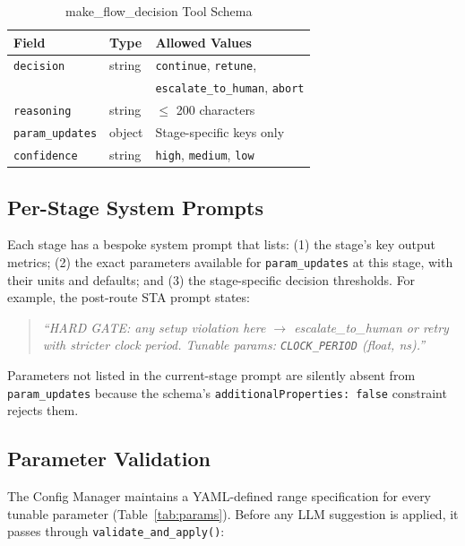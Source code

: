 \documentclass[conference]{IEEEtran}
\begin{document}
\begin{table}[t]
\caption{make\_flow\_decision Tool Schema}
\label{tab:schema}
\centering
\small
\setlength{\tabcolsep}{4pt}
\begin{tabular}{lll}
\toprule
\textbf{Field} & \textbf{Type} & \textbf{Allowed Values} \\
\midrule
\texttt{decision}      & string & \texttt{continue}, \texttt{retune}, \\
                       &        & \texttt{escalate\_to\_human}, \texttt{abort} \\
\texttt{reasoning}     & string & $\leq$ 200 characters \\
\texttt{param\_updates} & object & Stage-specific keys only \\
\texttt{confidence}    & string & \texttt{high}, \texttt{medium}, \texttt{low} \\
\bottomrule
\end{tabular}
\end{table}

\subsection{Per-Stage System Prompts}

Each stage has a bespoke system prompt that lists: (1) the stage's
key output metrics; (2) the exact parameters available for
\texttt{param\_updates} at this stage, with their units and defaults;
and (3) the stage-specific decision thresholds.
For example, the post-route STA prompt states:

\begin{quote}
\small\itshape
``HARD GATE: any setup violation here $\rightarrow$ escalate\_to\_human
or retry with stricter clock period.
Tunable params: \texttt{CLOCK\_PERIOD} (float, ns).''
\end{quote}

Parameters not listed in the current-stage prompt are silently absent
from \texttt{param\_updates} because the schema's
\texttt{additionalProperties: false} constraint rejects them.

\subsection{Parameter Validation}

The Config Manager maintains a YAML-defined range specification for
every tunable parameter (Table~\ref{tab:params}).
Before any LLM suggestion is applied, it passes through
\texttt{validate\_and\_apply()}:
\end{document}
